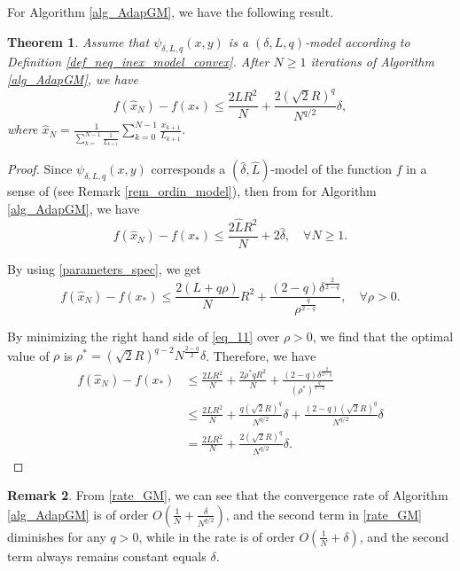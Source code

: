 \documentclass[11pt]{amsart}
\newtheorem{theorem}{Theorem}[section]
\theoremstyle{definition}
\newtheorem{remark}[theorem]{Remark}
\numberwithin{equation}{section}
\begin{document}
For Algorithm \ref{alg_AdapGM}, we have the following result. 

\begin{theorem}\label{theo_Adaptive_GM}
Assume that $\psi_{\delta,L,q}(x,y)$ is a $(\delta, L, q)$-model according to Definition \ref{def_neq_inex_model_convex}. After $N \geq 1$ iterations of Algorithm \ref{alg_AdapGM}, we have
\begin{equation}\label{rate_GM}
    f(\widehat{x}_N) - f(x_*) \leq \frac{2L R^2}{N} + \frac{2 \left(\sqrt{2} R\right)^q}{N^{q/2}} \delta,
\end{equation}
where $\widehat{x}_N = \frac{1}{\sum_{k = }^{N-1} \frac{1}{L_{k+1}}} \sum_{k = 0}^{N-1} \frac{x_{k+1}}{L_{k+1}} $.
\end{theorem}

\begin{proof}
Since $\psi_{\delta,L, q} (x, y)$ corresponds a $(\widehat{\delta}, \widehat{L})$-model of the function $f$ in a sense of \cite{Gasnikov2019fast} (see Remark \ref{rem_ordin_model}), then  from \cite{Gasnikov2019fast} for Algorithm \ref{alg_AdapGM}, we have
\begin{equation*}
    f(\widehat{x}_N) - f(x_*) \leq \frac{2 \widehat{L} R^2}{N} + 2 \widehat{\delta}, \quad \forall N \geq 1. 
\end{equation*}

By using \eqref{parameters_spec}, we get
\begin{equation}\label{eq_11}
    f(\widehat{x}_N) - f(x_*) \leq \frac{2 ( L + q \rho)}{N} R^2 + \frac{(2-q) \delta^{\frac{2}{2-q}}}{ \rho^{\frac{q}{2-q}}}, \quad \forall \rho >0.
\end{equation}

By minimizing the right hand side of \eqref{eq_11} over $\rho >0$, we find that the optimal value of $\rho$ is $\rho^* = \left(\sqrt{2}R\right)^{q-2} N^{\frac{2-q}{2}} \delta$. Therefore, we have
\begin{align*}
  f(\widehat{x}_N) - f(x_*) & \leq \frac{2LR^2}{N} + \frac{2 \rho^* q R^2}{N} +    \frac{(2-q) \delta^{\frac{2}{2-q}}}{ (\rho^*)^{\frac{q}{2-q}}}
  \\& \leq \frac{2LR^2}{N} + \frac{q \left(\sqrt{2}R\right)^q}{N^{q/2}}\delta + \frac{(2-q) \left(\sqrt{2}R\right)^q }{N^{q/2}}  \delta
  \\& = \frac{2LR^2}{N} + \frac{2 \left(\sqrt{2}R\right)^q }{N^{q/2}}\delta. 
\end{align*}
\end{proof}

\begin{remark}
From \eqref{rate_GM}, we can see that the convergence rate of Algorithm \ref{alg_AdapGM} is of order $O\left( \frac{1}{N} + \frac{\delta}{N^{q/2}} \right)$, and the second term in \eqref{rate_GM} diminishes for any $q>0$, while in \cite{Devolder2013smooth,Gasnikov2019fast,Stonyakin2021OMS} the rate is of order $O\left( \frac{1}{N} + \delta \right)$, and the second term always remains constant equals $\delta$.  
\end{remark}
\end{document}
